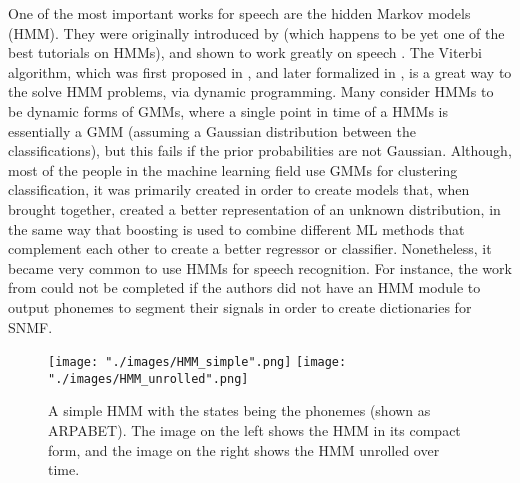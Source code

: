 One of the most important works for speech are the hidden Markov models (HMM). They were originally introduced by \cite{rabiner_juang_hmm} (which happens to be yet one of the best tutorials on HMMs), and shown to work greatly on speech \cite{rabiner_hmm_speech}. The Viterbi algorithm, which was first proposed in \cite{viterbi_original}, and later formalized in \cite{viterbi_algorithm}, is a great way to the solve HMM problems, via dynamic programming. Many consider HMMs to be dynamic forms of GMMs, where a single point in time of a HMMs is essentially a GMM (assuming a Gaussian distribution between the classifications), but this fails if the prior probabilities are not Gaussian. Although, most of the people in the machine learning field use GMMs for clustering classification, it was primarily created in order to create models that, when brought together, created a better representation of an unknown distribution, in the same way that boosting is used to combine different ML methods that complement each other to create a better regressor or classifier. Nonetheless, it became very common to use HMMs for speech recognition. For instance, the work from \cite{singlechannel} could not be completed if the authors did not have an HMM module to output phonemes to segment their signals in order to create dictionaries for SNMF.

\begin{figure}[ht]
\begin{center}
    \texttt{[image: "./images/HMM\_simple".png]}
    \texttt{[image: "./images/HMM\_unrolled".png]}
    \caption{ A simple HMM with the states being the phonemes (shown as ARPABET). The image on the left shows the HMM in its compact form, and the image on the right shows the HMM unrolled over time.}
    \label{fig::hmm_simple_unrolled}
\end{center}
\end{figure}


